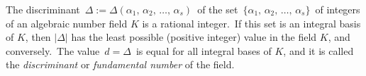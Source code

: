 \documentclass[12pt]{article}
\theoremstyle{definition}
\begin{document}
The discriminant\, $\Delta := \Delta(\alpha_1,\,\alpha_2,\,\ldots,\,\alpha_s)$\, of the set\, $\{\alpha_1,\,\alpha_2,\,\ldots,\,\alpha_s\}$\, of integers of an algebraic number field $K$ is a rational integer.\, If this set is an integral basis of $K$, then $|\Delta|$ has the least possible (positive integer) value in the field $K$, and conversely.\, The value\, $d = \Delta$\, is equal for all integral bases of $K$, and it is called the {\em discriminant} or {\em fundamental number} of the field.
\end{document}
